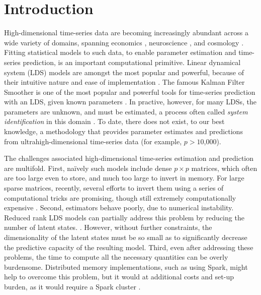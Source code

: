 \documentclass[fleqn,12pt]{article}
\newcommand{\mrsid}{{\sc \texttt{Mr}.~\texttt{Sid}}}
\begin{document}
\section{Introduction}

High-dimensional time-series data are becoming increasingly abundant across a wide variety of domains, spanning economics \citep{Johansen1988}, neuroscience \citep{Friston2003a},   and cosmology \citep{Xie2013a}.
Fitting statistical models to such data, to enable parameter estimation and time-series prediction, is an important computational primitive.
Linear dynamical system (LDS) models are amongst the most popular and powerful, because of their intuitive nature and ease of implementation \citep{Kalman1963}.   The famous Kalman Filter Smoother is one of the most popular and powerful tools for time-series prediction with an LDS, given known parameters \citep{Kalman1960a}.
In practive, however, for many LDSs, the parameters are unknown, and must be estimated, a process often called \emph{system identification} in this domain \citep{Ljung1998}.  To date, there does not exist, to our best knowledge, a methodology that provides parameter estimates and predictions from ultrahigh-dimensional time-series data (for example, $p > 10$,$000$).

The challenges associated high-dimensional time-series estimation and prediction are multifold.  First, na\"{i}vely such models include dense $p \times p$ matrices, which often are too large even to store, and much too large to invert in memory.  For large sparse matrices, recently, several efforts to invert them using a series of computational tricks are promising, though still extremely computationally expensive  \citep{Hsieh2013, Banerjee2013a}.
Second, estimators behave poorly, due to numerical instability.
Reduced rank LDS models can partially address this problem by reducing the number of latent states.  \citep{CHEN1989}.  However, without further constraints, the dimensionality of the latent states must be so small as to significantly decrease the predictive capacity of the resulting model.  Third, even after addressing these problems, the time to compute all the necessary quantities can be overly burdensome. Distributed memory implementations, such as using Spark, might help to overcome this problem, but it would at additional costs and set-up burden, as it would require a Spark cluster \citep{Zaharia2010}.
\end{document}
